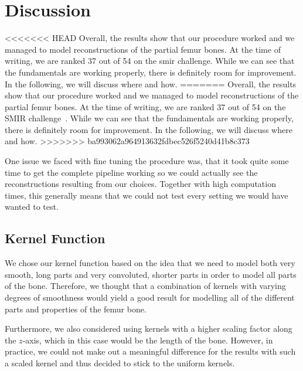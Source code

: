 \section{Discussion}
\label{sec:discussion}
<<<<<<< HEAD
Overall, the results show that our procedure worked and we managed to model reconstructions of the partial femur bones. At the time of writing, we are ranked 37 out of 54 on the smir challenge. While we can see that the fundamentals are working properly, there is definitely room for improvement. In the following, we will discuss where and how.
=======
Overall, the results show that our procedure worked and we managed to model reconstructions of the partial femur bones. 
At the time of writing, we are ranked 37 out of 54 on the SMIR challenge~\cite{smir}. 
While we can see that the fundamentals are working properly, there is definitely room for improvement. 
In the following, we will discuss where and how.
>>>>>>> ba993062a964913632fdbec526f5240d41b8c373

One issue we faced with fine tuning the procedure was, that it took quite some time to get the complete pipeline working so we could actually see the reconstructions resulting from our choices. 
Together with high computation times, this generally means that we could not test every setting we would have wanted to test.
		

\subsection{Kernel Function}
\label{subsec:kernfuncdisc}
We chose our kernel function based on the idea that we need to model both very smooth, long parts and very convoluted, shorter parts in order to model all parts of the bone. 
Therefore, we thought that a combination of kernels with varying degrees of smoothness would yield a good result for modelling all of the different parts and properties of the femur bone. 

Furthermore, we also considered using kernels with a higher scaling factor along the $z$-axis, which in this case would be the length of the bone. 
However, in practice, we could not make out a meaningful difference for the results with such a scaled kernel and thus decided to stick to the uniform kernels.

